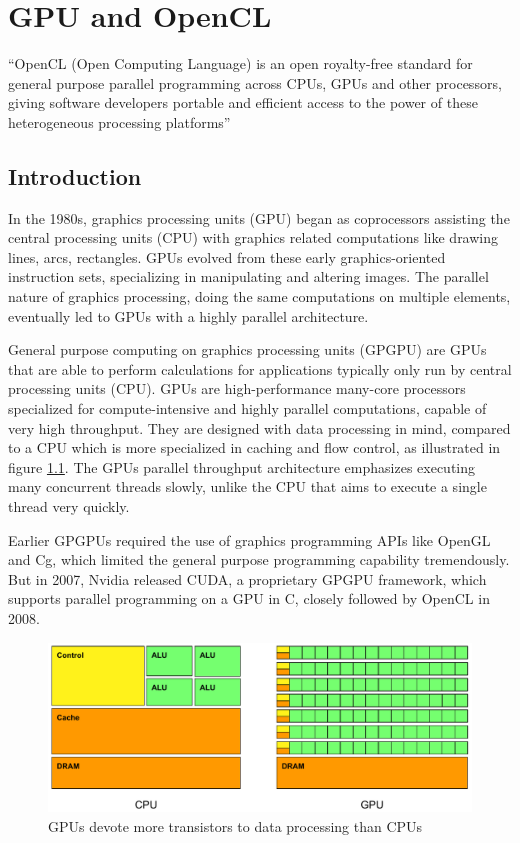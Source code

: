 \chapter{GPU and OpenCL}

``OpenCL (Open Computing Language) is an open royalty-free standard
for general purpose parallel programming across CPUs, GPUs and other
processors, giving software developers portable and efficient access
to the power of these heterogeneous processing platforms''
\cite{cl-spec}

\section{Introduction}

In the 1980s, graphics processing units (GPU) began as coprocessors
assisting the central processing units (CPU) with graphics related
computations like drawing lines, arcs, rectangles. GPUs evolved from
these early graphics-oriented instruction sets, specializing in
manipulating and altering images. The parallel nature of graphics
processing, doing the same computations on multiple elements,
eventually led to GPUs with a highly parallel architecture.

General purpose computing on graphics processing units (GPGPU) are
GPUs that are able to perform calculations for applications typically
only run by central processing units (CPU). GPUs are high-performance
many-core processors specialized for compute-intensive and highly
parallel computations, capable of very high throughput. They are
designed with data processing in mind, compared to a CPU which is more
specialized in caching and flow control, as illustrated in figure
\ref{fig:cpu-vs-gpu}. The GPUs parallel throughput architecture
emphasizes executing many concurrent threads slowly, unlike the CPU
that aims to execute a single thread very quickly.

Earlier GPGPUs required the use of graphics programming APIs like
OpenGL and Cg, which limited the general purpose programming
capability tremendously. But in 2007, Nvidia released CUDA, a
proprietary GPGPU framework, which supports parallel programming on a
GPU in C, closely followed by OpenCL in 2008.

\begin{figure}
  \includegraphics[width=\textwidth]{images/cpu-vs-gpu.pdf}
  \caption{GPUs devote more transistors to data processing than CPUs}
  \label{fig:cpu-vs-gpu}
\end{figure}



